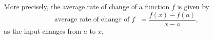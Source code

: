 \documentclass{ximera}
\begin{document}
\begin{comment}
	          \addplot [textColor] plot coordinates {(3.3,2.4) (3.3,3.6)}; %
	          \addplot [textColor] plot coordinates {(3.7,2.4) (3.7,3.6)}; %
	          \addplot [textColor] plot coordinates {(3.3,3.6) (3.7,3.6)}; %
	          \addplot [textColor] plot coordinates {(3.3,2.4) (3.7,2.4)}; %
	
	          \addplot [textColor] plot coordinates {(5.334,1) (5.334,5)}; %
	          \addplot [textColor] plot coordinates {(6.666,1) (6.666,5)}; %
	          \addplot [textColor] plot coordinates {(5.334,1) (6.666,1)}; %
	          \addplot [textColor] plot coordinates {(5.334,5) (6.666,5)}; %
	
	          \node at (axis cs:2.2,0) [anchor=east] {$x$};
	          \node at (axis cs:0,6.6) [anchor=north] {$y$};
	        \end{axis}
	\end{tikzpicture}
	\end{image}
\end{comment}

More precisely, the average rate of change of a function $f$ is given by
\[{\text{average rate of change of  $f$ }} =\frac{f(x)-f(a)}{x-a},\]
as the input changes from $a$ to $x$.
\end{document}
